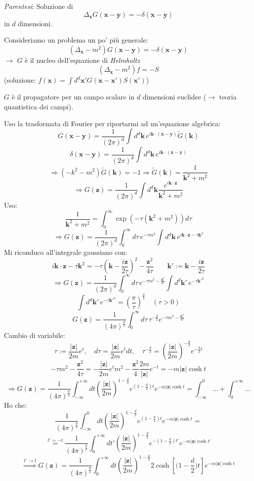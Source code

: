\documentclass[a4paper,11pt]{report}
\newcommand{\x}{\boldsymbol{x}}
\newcommand{\y}{\boldsymbol{y}}
\newcommand{\kk}{\boldsymbol{k}}
\newcommand{\kp}{\boldsymbol{k}'}
\newcommand{\z}{\boldsymbol{z}}
\begin{document}
\medskip

\emph{Parentesi}: Soluzione di
\[
\Delta_{\x}G(\x-\y )=-\delta(\x-\y )
\]
in $d$ dimensioni.

Consideriamo un problema un po' pi\`u generale:
\begin{equation}
(\Delta_{\x}-m^2)G(\x-\y )=-\delta(\x-\y )
\end{equation}
$\rightarrow$ $G$ \`e il nucleo dell'equazione di \emph{Helmholtz} 
\begin{equation}
(\Delta_{\x}-m^2)f=-S
\end{equation}
(soluzione: $f(\x)=\int d^d\x'G(\x-\x')S(\x')$)

$G$ \`e il propagatore per un campo scalare in $d$ dimensioni euclidee ($\rightarrow$ teoria quantistica dei campi). 

Uso la trasformata di Fourier per riportarmi ad un'equazione algebrica:
\[
G(\x-\y )=\frac{1}{(2\pi)^d}\int d^d \kk\, e^{i\kk \cdot(\x-\y )}\tilde{G}(\kk )
\]
\[
\delta(\x-\y )=\frac{1}{(2\pi)^d}\int d^d \kk\, e^{i\kk \cdot(\x-\y )}
\]
\[
\Rightarrow (-k^2-m^2)\tilde{G}(\kk )=-1\Rightarrow \tilde{G}(\kk )=\frac{1}{\kk ^2+m^2}
\]
\begin{equation}
\Rightarrow G(\z)=\frac{1}{(2\pi)^d}\int d^d \kk  \frac{e^{i\kk\cdot \z}}{\kk ^2+m^2}
\end{equation}
Uso:
\begin{equation}
\frac{1}{\kk ^2+m^2}=\int_0^{\infty}\exp\left( -\tau(\kk ^2+m^2)\right)d\tau
\end{equation}
\[
\Rightarrow G(\z)=\frac{1}{(2\pi)^d}\int_0^{\infty}d\tau\, e^{-\tau m^2}\int d^d \kk \, e^{i\kk\cdot \z-\tau\kk ^2}
\]
Mi riconduco all'integrale gaussiano con:
\[
i\kk\cdot\z-\tau\kk^2=-\tau\left(\kk-\frac{i\z}{2\tau}\right)^2-\frac{\z^2}{4\tau} \qquad \kp:=\kk-\frac{i\z}{2\tau}
\]
\[
\Rightarrow G(\z)=\frac{1}{(2\pi)^d}\int_0^{\infty}d\tau \, e^{-\tau m^2-\frac{\z^2}{4\tau}} \int d^d\kp \, e^{-\tau\kp^2}
\]
\[
\int d^d\kp \, e^{-\tau\kp^2}=\left(\frac{\pi}{\tau}\right)^\frac{d}{2} \quad (\tau>0)
\]
\[
G(\z)=\frac{1}{(4\pi)^\frac{d}{2}} \int_{0}^{\infty} d\tau\, \tau^{-\frac{d}{2}}e^{-\tau m^2 - \frac{\z^2}{4\tau}}
\]
Cambio di variabile:
\[
\tau:=\frac{|\z|}{2m}e^t, \quad d\tau=\frac{|\z|}{2m}e^t dt, \quad \tau^{-\frac{d}{2}}=\left(\frac{|\z|}{2m}\right)^{-\frac{d}{2}}e^{-\frac{d}{2}t}
\]
\[
-\tau m^2-\frac{\z^2}{4\tau}=-\frac{|\z|}{2 m}e^t m^2-\frac{\z^2}{4}\frac{2m}{|\z|}e^{-t}=-m|\z|\cosh t
\]
\[
\Rightarrow G(\z)=\frac{1}{(4\pi)^\frac{d}{2}} \int_{-\infty}^{+\infty}dt \left(\frac{|\z|}{2m}\right)^{1-\frac{d}{2}}e^{(1-\frac{d}{2})t}e^{-m|\z|\cosh t} 
=\int_{-\infty}^{0}\dots+\int_{0}^{+\infty} \dots
\]
Ho che:
\[
\frac{1}{(4\pi)^\frac{d}{2}} \int_{-\infty}^{0}dt \left(\frac{|\z|}{2m}\right)^{1-\frac{d}{2}}e^{(1-\frac{d}{2})t}e^{-m|\z|\cosh t} = 
\]
\[
\overset{t'=-t}{=}\frac{1}{(4\pi)^\frac{d}{2}} \int_{0}^{+\infty}dt' \left(\frac{|\z|}{2m}\right)^{1-\frac{d}{2}}e^{-(1-\frac{d}{2})t'}e^{-m|\z|\cosh t'}
\]
\[
\overset{t'\rightarrow t}{\Rightarrow} G(\z)=\frac{1}{(4\pi)^\frac{d}{2}}\int_0^{+\infty}dt\left(\frac{|\z|}{2m}\right)^{1-\frac{d}{2}} 2\cosh{ \left[\Big(1-\frac{d}{2}\Big)t\right]}e^{-m|\z|\cosh t}
\]
\end{document}

